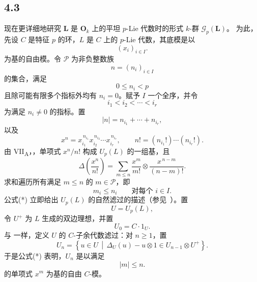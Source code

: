 
\subsection*{4.3}
\label{sga3:VIIB:4.3}
现在更详细地研究 \(\mathbf L\) 是 \(\mathbf O_k\) 上的平坦 \(p\)-Lie 代数时的形式 \(k\)-群 \(\mathscr G_p(\mathbf L)\)。
为此，先设 \(C\) 是特征 \(p\) 的环，\(L\) 是 \(C\) 上的 \(p\)-Lie 代数，其底模是以
\[
  (x_i)_{i\in I}.
\]
为基的自由模。令 \(\mathcal P\) 为非负整数族
\[
  n=(n_i)_{i\in I}
\]
的集合，满足
\[
  0\leq n_i<p
\]
且除可能有限多个指标外均有 \(n_i=0\)。赋予 \(I\) 一个全序，并令
\[
  i_1<i_2<\cdots<i_r
\]
为满足 \(n_i\ne0\) 的指标。置
\[
  |n|=n_{i_1}+\cdots+n_{i_r},
\]
以及
\[
  x^n
  =
  x_{i_1}^{\,n_{i_1}}
  x_{i_2}^{\,n_{i_2}}
  \cdots
  x_{i_r}^{\,n_{i_r}},
  \qquad
  n!
  =
  (n_{i_1}!)\cdots(n_{i_r}!).
\]
由 VII\textsubscript{A}，，单项式 \(x^n/n!\) 构成 \(U_p(L)\) 的一组基，且
\begin{equation}
  \Delta\left(\frac{x^n}{n!}\right)
  =
  \sum_{m\leq n}
  \frac{x^m}{m!}
  \otimes
  \frac{x^{\,n-m}}{(n-m)!}.
  \tag{*}
  \label{sga3:VIIB:4.3:restricted-pbw-comultiplication}
\end{equation}
求和遍历所有满足 \(m\leq n\) 的 \(m\in\mathcal P\)，即
\[
  m_i\leq n_i
  \qquad\text{对每个 }i\in I.
\]
公式\textup{(*)} 立即给出 \(U_p(L)\) 的自然滤过的描述\textup{（参见\ ）}。置
\[
  U=U_p(L),
\]
令 \(U^+\) 为 \(L\) 生成的双边理想，并置
\[
  U_0=C\cdot1_U.
\]
与  一样，定义 \(U\) 的 \(C\)-子余代数滤过：对 \(n\geq1\)，置
\[
  U_n
  =
  \left\{
    u\in U
    \,\middle|\,
    \Delta_U(u)-u\otimes1
    \in U_{n-1}\otimes U^+
  \right\}.
\]
于是公式\textup{(*)} 表明，\(U_n\) 是以满足
\[
  |m|\leq n.
\]
的单项式 \(x^m\) 为基的自由 \(C\)-模。
